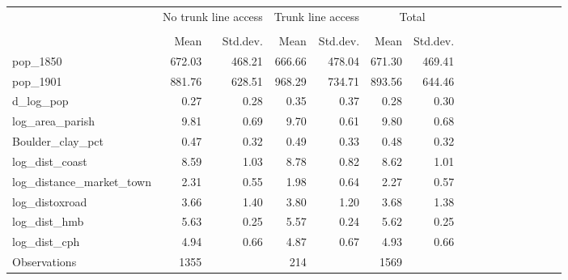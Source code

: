 {
\def\sym#1{\ifmmode^{#1}\else\(^{#1}\)\fi}
\begin{tabular}{l*{3}{rrrrr}}
\toprule
                    &\multicolumn{2}{c}{No trunk line access}&\multicolumn{2}{c}{Trunk line access}&\multicolumn{2}{c}{Total}\\\cmidrule(lr){2-3}\cmidrule(lr){4-5}\cmidrule(lr){6-7}
                    &\multicolumn{2}{c}{}     &\multicolumn{2}{c}{}     &\multicolumn{2}{c}{}     \\
                    &        Mean&    Std.dev.&        Mean&    Std.dev.&        Mean&    Std.dev.\\
\midrule
pop\_1850            &      672.03&      468.21&      666.66&      478.04&      671.30&      469.41\\
pop\_1901            &      881.76&      628.51&      968.29&      734.71&      893.56&      644.46\\
d\_log\_pop           &        0.27&        0.28&        0.35&        0.37&        0.28&        0.30\\
log\_area\_parish     &        9.81&        0.69&        9.70&        0.61&        9.80&        0.68\\
Boulder\_clay\_pct    &        0.47&        0.32&        0.49&        0.33&        0.48&        0.32\\
log\_dist\_coast      &        8.59&        1.03&        8.78&        0.82&        8.62&        1.01\\
log\_distance\_market\_town&        2.31&        0.55&        1.98&        0.64&        2.27&        0.57\\
log\_distoxroad      &        3.66&        1.40&        3.80&        1.20&        3.68&        1.38\\
log\_dist\_hmb        &        5.63&        0.25&        5.57&        0.24&        5.62&        0.25\\
log\_dist\_cph        &        4.94&        0.66&        4.87&        0.67&        4.93&        0.66\\
\midrule
Observations        &        1355&            &         214&            &        1569&            \\
\bottomrule
\end{tabular}
}
